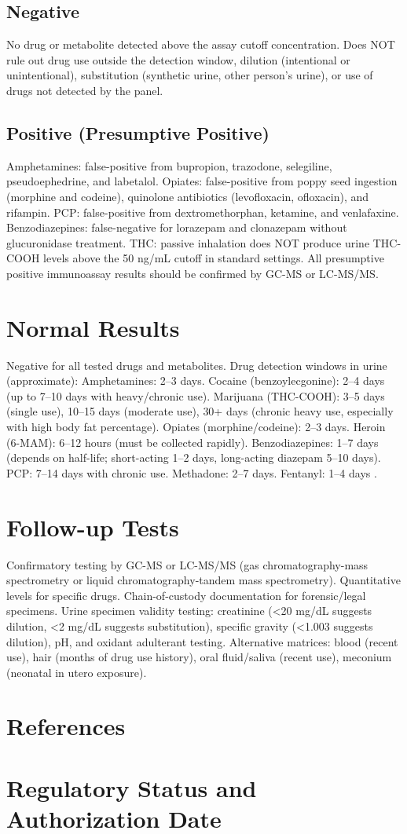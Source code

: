 \subsection*{Negative}
No drug or metabolite detected above the assay cutoff concentration. Does NOT rule out drug use outside the detection window, dilution (intentional or unintentional), substitution (synthetic urine, other person's urine), or use of drugs not detected by the panel.
\subsection*{Positive (Presumptive Positive)}
Amphetamines: false-positive from bupropion, trazodone, selegiline, pseudoephedrine, and labetalol. Opiates: false-positive from poppy seed ingestion (morphine and codeine), quinolone antibiotics (levofloxacin, ofloxacin), and rifampin. PCP: false-positive from dextromethorphan, ketamine, and venlafaxine. Benzodiazepines: false-negative for lorazepam and clonazepam without glucuronidase treatment. THC: passive inhalation does NOT produce urine THC-COOH levels above the 50 ng/mL cutoff in standard settings. All presumptive positive immunoassay results should be confirmed by GC-MS or LC-MS/MS.
\section*{Normal Results}
Negative for all tested drugs and metabolites. Drug detection windows in urine (approximate): Amphetamines: 2--3 days. Cocaine (benzoylecgonine): 2--4 days (up to 7--10 days with heavy/chronic use). Marijuana (THC-COOH): 3--5 days (single use), 10--15 days (moderate use), 30+ days (chronic heavy use, especially with high body fat percentage). Opiates (morphine/codeine): 2--3 days. Heroin (6-MAM): 6--12 hours (must be collected rapidly). Benzodiazepines: 1--7 days (depends on half-life; short-acting 1--2 days, long-acting diazepam 5--10 days). PCP: 7--14 days with chronic use. Methadone: 2--7 days. Fentanyl: 1--4 days \cite{baselt2017disposition}.
\section*{Follow-up Tests}
Confirmatory testing by GC-MS or LC-MS/MS (gas chromatography-mass spectrometry or liquid chromatography-tandem mass spectrometry). Quantitative levels for specific drugs. Chain-of-custody documentation for forensic/legal specimens. Urine specimen validity testing: creatinine (<20 mg/dL suggests dilution, <2 mg/dL suggests substitution), specific gravity (<1.003 suggests dilution), pH, and oxidant adulterant testing. Alternative matrices: blood (recent use), hair (months of drug use history), oral fluid/saliva (recent use), meconium (neonatal in utero exposure).
\section*{References}


\clearpage
\section*{Regulatory Status and Authorization Date}

\clearpage
